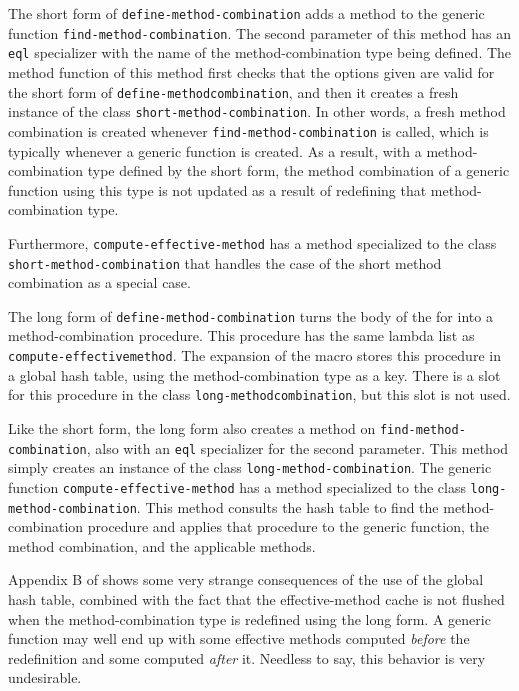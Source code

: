 The short form of \texttt{define-method-combination} adds a method to
the generic function \texttt{find-method-combination}.  The second
parameter of this method has an \texttt{eql} specializer with the name
of the method-combination type being defined.  The method function of
this method first checks that the options given are valid for the
short form of \texttt{define-method\-combination}, and then it creates
a fresh instance of the class \texttt{short-method-combination}.  In
other words, a fresh method combination is created whenever
\texttt{find-method-combination} is called, which is typically
whenever a generic function is created.  As a result, with a
method-combination type defined by the short form, the method
combination of a generic function using this type is not updated as a
result of redefining that method-combination type.

Furthermore, \texttt{compute-effective-method} has a method
specialized to the class \texttt{short-method-combination} that
handles the case of the short method combination as a special case.

The long form of \texttt{define-method-combination} turns the body of
the for into a method-combination procedure.  This procedure has the
same lambda list as \texttt{compute-effective\-method}.  The expansion
of the macro stores this procedure in a global hash table, using the
method-combination type as a key.  There is a slot for this procedure
in the class \texttt{long-method\-combination}, but this slot is not
used.

Like the short form, the long form also creates a method on
\texttt{find-method-combination}, also with an \texttt{eql}
specializer for the second parameter. This method simply creates an
instance of the class \texttt{long-method-combination}.  The generic
function \texttt{compute-effective-method} has a method specialized to
the class \texttt{long-method-combination}.  This method consults the
hash table to find the method-combination procedure and applies that
procedure to the generic function, the method combination, and the
applicable methods.

Appendix B of \cite{verna.18.els} shows some very strange consequences
of the use of the global hash table, combined with the fact that the
effective-method cache is not flushed when the method-combination type
is redefined using the long form.  A generic function may well end up
with some effective methods computed \emph{before} the redefinition
and some  computed \emph{after} it.  Needless to say, this behavior is
very undesirable.


